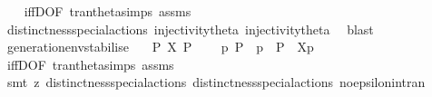 \begin{isabellebody}
%
\isadelimproof
\ \ %
\endisadelimproof
%
\isatagproof
{}\isamarkupfalse%
\ iffD{}{\isacharbrackleft}{\kern0pt}OF\ tran{\isacharunderscore}{\kern0pt}theta{\isachardot}{\kern0pt}simps\ assms{\isacharbrackright}{\kern0pt}\isanewline
\ \ \isamarkupfalse%
\ distinctness{\isacharunderscore}{\kern0pt}special{\isacharunderscore}{\kern0pt}actions{\isacharparenleft}{\kern0pt}{}{\isacharparenright}{\kern0pt}\ injectivity{\isacharunderscore}{\kern0pt}theta{\isacharparenleft}{\kern0pt}{}{\isacharparenright}{\kern0pt}\ injectivity{\isacharunderscore}{\kern0pt}theta{\isacharparenleft}{\kern0pt}{}{\isacharparenright}{\kern0pt}\ \isamarkupfalse%
\ blast%
\endisatagproof
{\isafoldproof}%
%
\isadelimproof
\isanewline
%
\endisadelimproof
\ \ \isanewline
{}\isamarkupfalse%
\ generation{\isacharunderscore}{\kern0pt}env{\isacharunderscore}{\kern0pt}stabilise{\isacharcolon}{\kern0pt}\isanewline
\ \ \ {\isacartoucheopen}P\ {\isasymlongmapsto}\isactrlsup {\isasymtheta}{\isasymepsilon}{\isacharbrackleft}{\kern0pt}X{\isacharbrackright}{\kern0pt}\ P{\isacharprime}{\kern0pt}{\isacartoucheclose}\isanewline
\ \ \ {\isacartoucheopen}{\isasymexists}\ p{\isachardot}{\kern0pt}\ P\ {\isacharequal}{\kern0pt}\ {\isasymtheta}{\isacharparenleft}{\kern0pt}p{\isacharparenright}{\kern0pt}\ {\isasymand}\ P{\isacharprime}{\kern0pt}\ {\isacharequal}{\kern0pt}\ {\isasymtheta}{\isacharbrackleft}{\kern0pt}X{\isacharbrackright}{\kern0pt}{\isacharparenleft}{\kern0pt}p{\isacharparenright}{\kern0pt}{\isacartoucheclose}\ \isanewline
%
\isadelimproof
\ \ %
\endisadelimproof
%
\isatagproof
{}\isamarkupfalse%
\ iffD{}{\isacharbrackleft}{\kern0pt}OF\ tran{\isacharunderscore}{\kern0pt}theta{\isachardot}{\kern0pt}simps\ assms{\isacharparenleft}{\kern0pt}{}{\isacharparenright}{\kern0pt}{\isacharbrackright}{\kern0pt}\ \isanewline
\ \ \isamarkupfalse%
\ {\isacharparenleft}{\kern0pt}smt\ {\isacharparenleft}{\kern0pt}z{}{\isacharparenright}{\kern0pt}\ distinctness{\isacharunderscore}{\kern0pt}special{\isacharunderscore}{\kern0pt}actions{\isacharparenleft}{\kern0pt}{}{\isacharparenright}{\kern0pt}\ distinctness{\isacharunderscore}{\kern0pt}special{\isacharunderscore}{\kern0pt}actions{\isacharparenleft}{\kern0pt}{}{\isacharparenright}{\kern0pt}\ no{\isacharunderscore}{\kern0pt}epsilon{\isacharunderscore}{\kern0pt}in{\isacharunderscore}{\kern0pt}tran{\isacharparenleft}{\kern0pt}{}{\isacharparenright}{\kern0pt}{\isacharparenright}{\kern0pt}%

\end{isabellebody}
